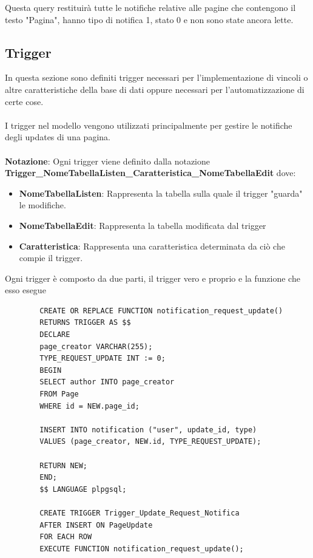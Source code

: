 \documentclass{article}
\begin{document}
    Questa query restituirà tutte le notifiche relative alle pagine che contengono il testo "Pagina", hanno tipo di notifica 1, stato 0 e non sono state ancora lette.

	\newpage
	
	\subsection{Trigger}
	In questa sezione sono definiti trigger necessari per l'implementazione di vincoli o altre caratteristiche della base di dati oppure necessari per l'automatizzazione di certe cose.\\\\
	I trigger nel modello vengono utilizzati principalmente per gestire le notifiche degli updates di una pagina.\\\\
	\textbf{Notazione}: Ogni trigger viene definito dalla notazione \textbf{Trigger\_NomeTabellaListen\_Caratteristica\_NomeTabellaEdit} dove:
	
	\begin{itemize}
		\item \textbf{NomeTabellaListen}: Rappresenta la tabella sulla quale il trigger "guarda" le modifiche.
		\item \textbf{NomeTabellaEdit}: Rappresenta la tabella modificata dal trigger
		\item \textbf{Caratteristica}: Rappresenta una caratteristica determinata da ci\`o che compie il trigger.
	\end{itemize}
	
	Ogni trigger \`e composto da due parti, il trigger vero e proprio e la funzione che esso esegue
	
	\begin{lstlisting}
		CREATE OR REPLACE FUNCTION notification_request_update()
		RETURNS TRIGGER AS $$
		DECLARE
		page_creator VARCHAR(255);
		TYPE_REQUEST_UPDATE INT := 0;
		BEGIN
		SELECT author INTO page_creator
		FROM Page
		WHERE id = NEW.page_id;
		
		INSERT INTO notification ("user", update_id, type)
		VALUES (page_creator, NEW.id, TYPE_REQUEST_UPDATE);
		
		RETURN NEW;
		END;
		$$ LANGUAGE plpgsql;
		
		CREATE TRIGGER Trigger_Update_Request_Notifica
		AFTER INSERT ON PageUpdate
		FOR EACH ROW
		EXECUTE FUNCTION notification_request_update();
	\end{lstlisting}
	
\end{document}
